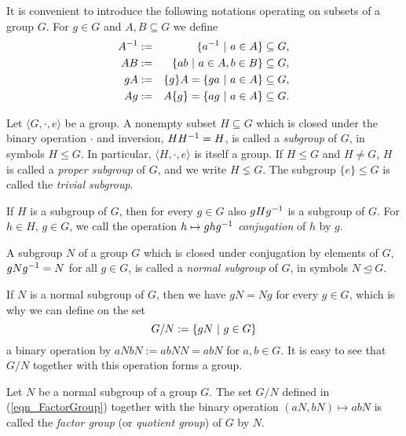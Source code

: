 It is convenient to introduce the following notations operating on subsets of a group $G$. For $g \in G$ and $A,B \subseteq G$ we define
\begin{eqnarray*}
{A}^{-1} &:=& \{ {a}^{-1} \ | \ a \in A \} \subseteq G, \\
AB &:=& \{ a b \ | \ a \in A, b \in B \} \subseteq G,\\
gA &:=& \{g\}A = \{ g a \ | \ a \in A \} \subseteq G,\\
Ag &:=& A\{g\} = \{ a g \ | \ a \in A \} \subseteq G.
\end{eqnarray*}

\begin{definition}[Subgroups]
\label{dfn_Subgroup}
Let $\langle G,\cdot,e \rangle$ be a group. A nonempty subset $H \subseteq G$ which is closed under the binary operation $\cdot$ and inversion, \ie $H{H}^{-1} = H$, is called a \emph{subgroup} of $G$, in symbols $H \le G$. In particular, $\langle H,\cdot,e \rangle$ is itself a group. If $H \le G$ and $H \ne G$, $H$ is called a \emph{proper subgroup} of $G$, and we write $H \lneq G$. The subgroup $\{e\} \le G$ is called the \emph{trivial subgroup}.
\end{definition}

If $H$ is a subgroup of $G$, then for every $g \in G$ also $gH{g}^{-1}$ is a subgroup of $G$. For $h \in H$, $g \in G$, we call the operation $h \mapsto g h {g}^{-1}$ \emph{conjugation} of $h$ by $g$.

\begin{definition}
\label{dfn_NormalSubgroup}
A subgroup $N$ of a group $G$ which is closed under conjugation by elements of $G$, \ie $g N {g}^{-1} = N$ for all $g \in G$, is called a \emph{normal subgroup} of $G$, in symbols $N \unlhd G$.
\end{definition}

If $N$ is a normal subgroup of $G$, then we have $gN = Ng$ for every $g \in G$, which is why we can define on the set
\begin{equation}
\label{eqn_FactorGroup}
G / N := \{ gN \ | \ g \in G \}
\end{equation}
a binary operation by $aNbN := abNN = abN$ for $a,b \in G$. It is easy to see that $G / N$ together with this operation forms a group.

\begin{definition}
\label{dfn_FactorGroup}
Let $N$ be a normal subgroup of a group $G$. The set $G / N$ defined in (\ref{eqn_FactorGroup}) together with the binary operation $(aN,bN) \mapsto abN$ is called the \emph{factor group} (or \emph{quotient group}) of $G$ by $N$.
\end{definition}

